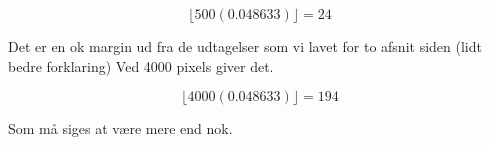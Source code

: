 \begin{equation}
	 \lfloor 500(0.048633)\rfloor = 24
\end{equation}

Det er en ok margin ud fra de udtagelser som vi lavet for to afsnit siden
(lidt bedre forklaring)
Ved 4000 pixels giver det.

\begin{equation}
	 \lfloor 4000(0.048633)\rfloor = 194
\end{equation}

Som må siges at være mere end nok.
